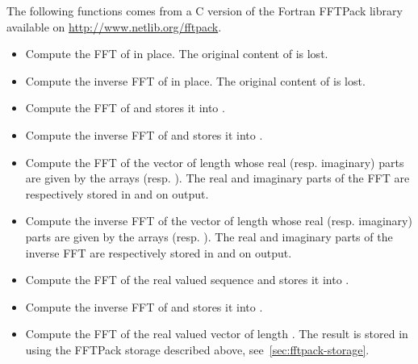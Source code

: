 The following functions comes from a C version of the Fortran FFTPack library
available on \url{http://www.netlib.org/fftpack}.
\begin{itemize}
\item {}
  \sshortdescribe Compute the FFT of  in place. The original content
  of  is lost.

\item {}
  \sshortdescribe Compute the inverse FFT of  in place. The
  original content of  is lost.

\item {}
  \sshortdescribe Compute the FFT of  and stores it into .

\item {}
  \sshortdescribe Compute the inverse FFT of  and stores it into .

\item {}
  \sshortdescribe Compute the FFT of the vector of length  whose real
  (resp. imaginary) parts are given by the arrays 
  (resp. ). The real and imaginary parts of the FFT are respectively
  stored in  and  on output.

\item {}
  \sshortdescribe Compute the inverse FFT of the vector of length 
  whose real (resp. imaginary) parts are given by the arrays 
  (resp. ). The real and imaginary parts of the inverse FFT are
  respectively stored in  and  on output.

\item {}
  \sshortdescribe Compute the FFT of the real valued sequence  and
  stores it into .

\item {}
  \sshortdescribe Compute the inverse FFT of  and stores it into .

\item {}
  \sshortdescribe Compute the FFT of the real valued vector  of
  length . The result is stored in  using the FFTPack storage
  described above, see~\ref{sec:fftpack-storage}.


\end{itemize}
